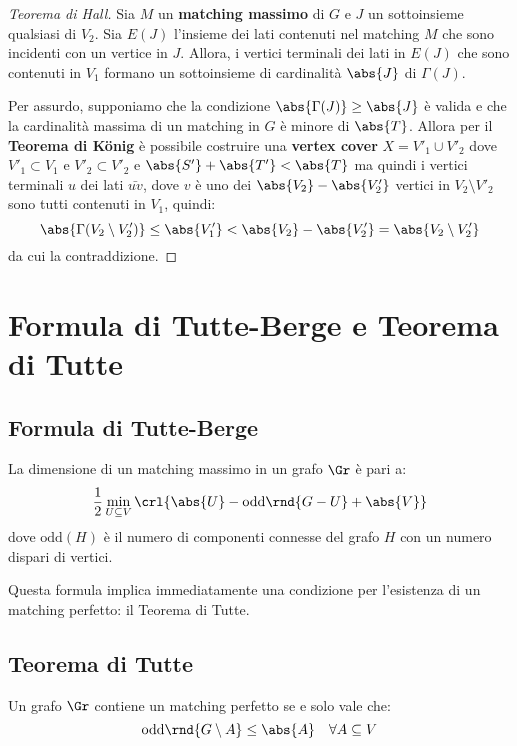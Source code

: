 \documentclass[\main/main.tex]{subfiles}
\begin{document}
\begin{proof}[Teorema di Hall]
	Sia \(M\) un \textbf{matching massimo} di \(G\) e \(J\) un sottoinsieme qualsiasi di \(V_2\). Sia \(E(J)\) l'insieme dei lati contenuti nel matching \(M\) che sono incidenti con un vertice in \(J\). Allora, i vertici terminali dei lati in \(E(J)\) che sono contenuti in \(V_1\) formano un sottoinsieme di cardinalità \(\abs{J}\) di \(\Gamma(J)\).

	Per assurdo, supponiamo che la condizione \(\abs{\Gamma(J)} \geq \abs{J}\) è valida e che la cardinalità massima di un matching in \(G\) è minore di \(\abs{T}\). Allora per il \textbf{Teorema di König} è possibile costruire una \textbf{vertex cover} \(X=V'_1 \cup V'_2\) dove \(V'_1 \subset V_1\) e \(V'_2 \subset V'_2\) e \(\abs{S'} + \abs{T'} < \abs{T}\) ma quindi i vertici terminali \(u\) dei lati \(\bar{uv}\), dove \(v\) è uno dei \(\abs{V_2} - \abs{V'_2}\) vertici in \(V_2\setminus V'_2\) sono tutti contenuti in \(V_1\), quindi:
	\[
		\abs{\Gamma(V_2\setminus V'_2)} \leq \abs{V'_1} < \abs{V_2} - \abs{V'_2} = \abs{V_2\setminus V'_2}
	\]
	da cui la contraddizione.
\end{proof}

\section{Formula di Tutte-Berge e Teorema di Tutte}
\subsection{Formula di Tutte-Berge}
\begin{theorem}
	La dimensione di un matching massimo in un grafo \(\Gr \) è pari a:
	\[
		\frac{1}{2} \min_{U \subseteq V} \crl{\abs{U} - \text{odd}\rnd{G-U} + \abs{V}}
	\]
	dove \(\text{odd}(H)\) è il numero di componenti connesse del grafo \(H\) con un numero dispari di vertici.
\end{theorem}

Questa formula implica immediatamente una condizione per l'esistenza di un matching perfetto: il Teorema di Tutte.

\subsection{Teorema di Tutte}
\begin{theorem}
	Un grafo \(\Gr \) contiene un matching perfetto se e solo vale che:
	\[
		\text{odd}\rnd{G\setminus A} \leq \abs{A} \quad \forall A \subseteq V
	\]
\end{theorem}
\clearpage
\end{document}
